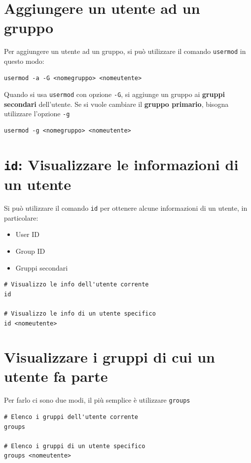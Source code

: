 \documentclass[a4paper]{report}
\newenvironment{info}{\begin{tcolorbox}[fonttitle=\sffamily\bfseries\large,title=Info,colframe=blue!75!white]}{\end{tcolorbox}}
\newenvironment{code}{\begin{tcolorbox}[size=small]}{\end{tcolorbox}}
\begin{document}
\section{Aggiungere un utente ad un gruppo}

Per aggiungere un utente ad un gruppo, si può utilizzare il comando \texttt{usermod} in questo modo:
\begin{code} 
\begin{lstlisting}
usermod -a -G <nomegruppo> <nomeutente>
\end{lstlisting}
\end{code}

\begin{info}
	Quando si usa \texttt{usermod} con opzione \texttt{-G}, si aggiunge un gruppo ai \textbf{gruppi secondari} dell'utente. Se si vuole cambiare il \textbf{gruppo primario}, bisogna utilizzare l'opzione \texttt{-g}
	
	\begin{lstlisting}
usermod -g <nomegruppo> <nomeutente>
	\end{lstlisting}
\end{info}

\section{\texttt{id}: Visualizzare le informazioni di un utente}
\label{sec:id}
Si può utilizzare il comando \texttt{id} per ottenere alcune informazioni di un utente, in particolare:
\begin{itemize}
	\item User ID
	\item Group ID
	\item Gruppi secondari
\end{itemize}

\begin{code} 
\begin{lstlisting}
# Visualizzo le info dell'utente corrente
id

# Visualizzo le info di un utente specifico
id <nomeutente>
\end{lstlisting}
\end{code}

\section{Visualizzare i gruppi di cui un utente fa parte}

Per farlo ci sono due modi, il più semplice è utilizzare \texttt{groups}
\begin{code} 
\begin{lstlisting}
# Elenco i gruppi dell'utente corrente
groups

# Elenco i gruppi di un utente specifico
groups <nomeutente>
\end{lstlisting}
\end{code}
\end{document}
